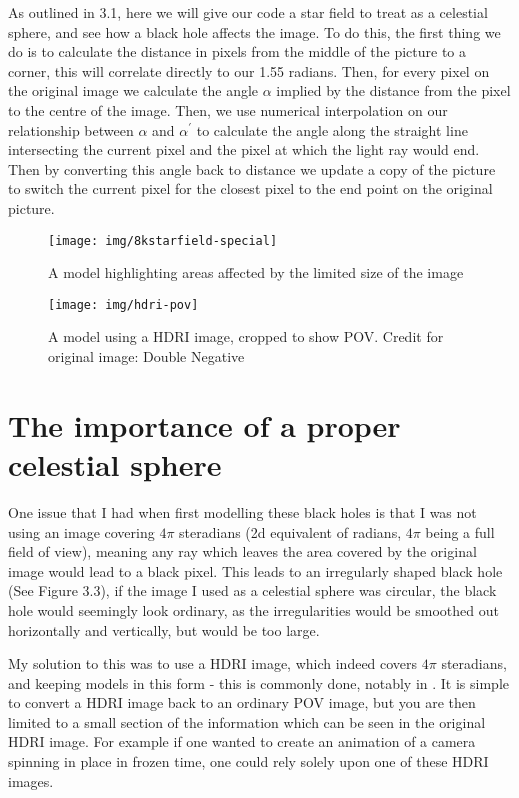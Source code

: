 \documentclass[oneside,openright,frontopenright]{dmathesis}
\begin{document}
	As outlined in 3.1, here we will give our code a star field to treat as a celestial sphere, and see how a black hole affects the image. To do this, the first thing we do is to calculate the distance in pixels from the middle of the picture to a corner, this will correlate directly to our 1.55 radians. Then, for every pixel on the original image we calculate the angle $\alpha$ implied by the distance from the pixel to the centre of the image. Then, we use numerical interpolation on our relationship between $\alpha$ and $\alpha^{'}$ to calculate the angle along the straight line intersecting the current pixel and the pixel at which the light ray would end. Then by converting this angle back to distance we update a copy of the picture to switch the current pixel for the closest pixel to the end point on the original picture.

\begin{figure}
	\centering
	\begin{minipage}{0.5\textwidth}
		\centering
		\texttt{[image: img/8kstarfield-special]}
		\caption{A model highlighting areas affected by the limited size of the image}
	\end{minipage}%
	\begin{minipage}{0.5\textwidth}
		\centering
		\texttt{[image: img/hdri-pov]}
		\caption{A model using a HDRI image, cropped to show POV. Credit for original image: Double Negative}
	\end{minipage}
\end{figure}

\section{The importance of a proper celestial sphere}

	One issue that I had when first modelling these black holes is that I was not using an image covering $4\pi$ steradians (2d equivalent of radians, $4\pi$ being a full field of view), meaning any ray which leaves the area covered by the original image would lead to a black pixel. This leads to an irregularly shaped black hole (See Figure 3.3), if the image I used as a celestial sphere was circular, the black hole would seemingly look ordinary, as the irregularities would be smoothed out horizontally and vertically, but would be too large. 

	My solution to this was to use a HDRI image, which indeed covers $4\pi$ steradians, and keeping models in this form - this is commonly done, notably in \cite{james2015gravitational}. It is simple to convert a HDRI image back to an ordinary POV image, but you are then limited to a small section of the information which can be seen in the original HDRI image. For example if one wanted to create an animation of a camera spinning in place in frozen time, one could rely solely upon one of these HDRI images.
\end{document}
